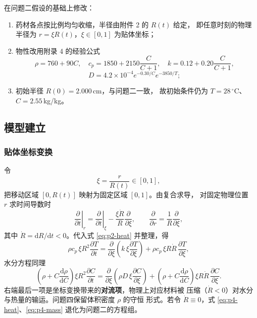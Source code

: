 \documentclass[12pt,a4paper]{ctexart}
\begin{document}
在问题二假设的基础上修改：

\begin{enumerate}
  \item[(C1)] 药材各点按比例均匀收缩，半径由附件 2 的 $R(t)$ 给定，
        即任意时刻的物理半径为 $r=\xi R(t)$，$\xi\in[0,1]$ 为贴体坐标；
  \item[(C2)] 物性改用附录 4 的经验公式
        \begin{equation}
          \rho=760+90C,\quad
          c_p=1850+2150\frac{C}{C+1},\quad
          k=0.12+0.20\frac{C}{C+1},
          \label{eq:p4-props}
        \end{equation}
        \begin{equation}
          D=4.2\times10^{-4}e^{-0.30/C}e^{-3850/T};
          \label{eq:p4-D}
        \end{equation}
  \item[(C3)] 初始半径 $R(0)=2.000$\,cm，与问题二一致，
        故初始条件仍为 $T=28\,^\circ$C、$C=2.55$\,kg/kg。
\end{enumerate}

\subsection{模型建立}

\subsubsection{贴体坐标变换}

令
\begin{equation}
  \xi=\frac{r}{R(t)}\in[0,1],
\end{equation}
把移动区域 $[0,R(t)]$ 映射为固定区域 $[0,1]$。由复合求导，
对固定物理位置 $r$ 求时间导数时
\begin{equation}
  \left.\frac{\partial}{\partial t}\right|_{r}
  =\left.\frac{\partial}{\partial t}\right|_{\xi}
   -\frac{\xi\dot R}{R}\frac{\partial}{\partial\xi},
  \qquad
  \frac{\partial}{\partial r}=\frac{1}{R}\frac{\partial}{\partial\xi},
  \label{eq:p4-transform}
\end{equation}
其中 $\dot R=\mathrm{d}R/\mathrm{d}t<0$。代入式 \eqref{eq:p2-heat}
并整理，得
\begin{equation}
  \rho c_p\,\xi R^2\frac{\partial T}{\partial t}
  =\frac{\partial}{\partial\xi}
   \left(k\,\xi\frac{\partial T}{\partial\xi}\right)
   +\rho c_p\,\xi R\dot R\,\frac{\partial T}{\partial\xi},
  \label{eq:p4-heat}
\end{equation}
水分方程同理
\begin{equation}
  \left(\rho+C\frac{\mathrm{d}\rho}{\mathrm{d}C}\right)\xi R^2
   \frac{\partial C}{\partial t}
  =\frac{\partial}{\partial\xi}
   \left(\rho D\,\xi\frac{\partial C}{\partial\xi}\right)
   +\left(\rho+C\frac{\mathrm{d}\rho}{\mathrm{d}C}\right)
    \xi R\dot R\,\frac{\partial C}{\partial\xi}.
  \label{eq:p4-mass}
\end{equation}
右端最后一项是坐标变换带来的\textbf{对流项}，物理上对应材料被
压缩（$\dot R<0$）对水分与热量的输运。问题四保留体积密度 $\rho$ 的守恒
形式。若令 $\dot R\equiv0$，式 \eqref{eq:p4-heat}、\eqref{eq:p4-mass}
退化为问题二的方程组。
\end{document}
